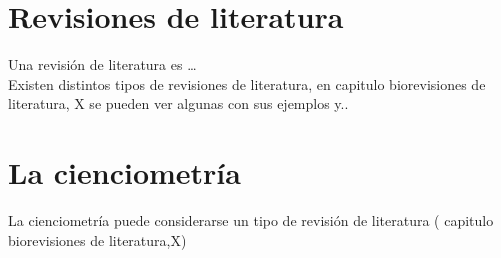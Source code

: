 \documentclass[../Main.tex]{subfiles}
\begin{document}
\section{Revisiones de literatura}
\noindent
Una revisión de literatura es …\\

Existen distintos tipos de revisiones de literatura, en   capitulo biorevisiones de literatura, X se pueden ver algunas con sus ejemplos y..

\section{La cienciometría}
\noindent
La cienciometría puede considerarse un tipo de revisión de literatura ( capitulo biorevisiones de literatura,X)\\
 
\end{document}
